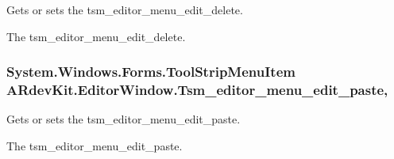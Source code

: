 Gets or sets the tsm\-\_\-editor\-\_\-menu\-\_\-edit\-\_\-delete. 

The tsm\-\_\-editor\-\_\-menu\-\_\-edit\-\_\-delete. \hypertarget{class_a_rdev_kit_1_1_editor_window_ac2310f24fffc1c84b2c23c5e6cbd8156}{
\subsubsection[{Tsm\-\_\-editor\-\_\-menu\-\_\-edit\-\_\-paste}]{\setlength{\rightskip}{0pt plus 5cm}System.\-Windows.\-Forms.\-Tool\-Strip\-Menu\-Item A\-Rdev\-Kit.\-Editor\-Window.\-Tsm\-\_\-editor\-\_\-menu\-\_\-edit\-\_\-paste\hspace{0.3cm}{\ttfamily [get]}, {\ttfamily [set]}}}\label{class_a_rdev_kit_1_1_editor_window_ac2310f24fffc1c84b2c23c5e6cbd8156}


Gets or sets the tsm\-\_\-editor\-\_\-menu\-\_\-edit\-\_\-paste. 

The tsm\-\_\-editor\-\_\-menu\-\_\-edit\-\_\-paste. 